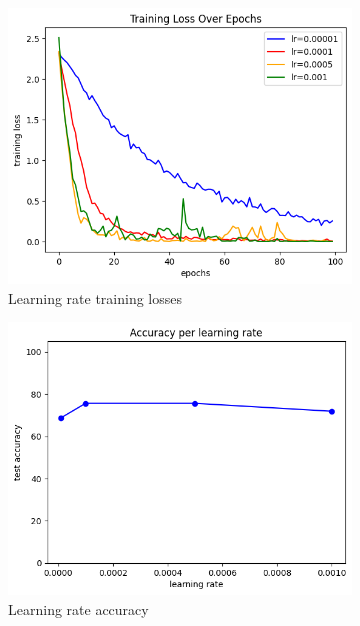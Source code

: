 \begin{figure}[htbp]
	\centering
	\begin{subfigure}{0.23\linewidth}
		\centering
		\includegraphics[width=\linewidth]{image/q4-7-lr-train.png}
		\caption{Learning rate training losses}
		\label{fig:q4-7-lr-train}
	\end{subfigure}%
	\hfill
	\begin{subfigure}{0.23\linewidth}
		\centering
		\includegraphics[width=\linewidth]{image/q4-7-lr.png}
		\caption{Learning rate accuracy}
		\label{fig:q4-7-lr}
	\end{subfigure}
	\hfill
	\begin{subfigure}{0.23\linewidth}

\end{subfigure}
\end{figure}
